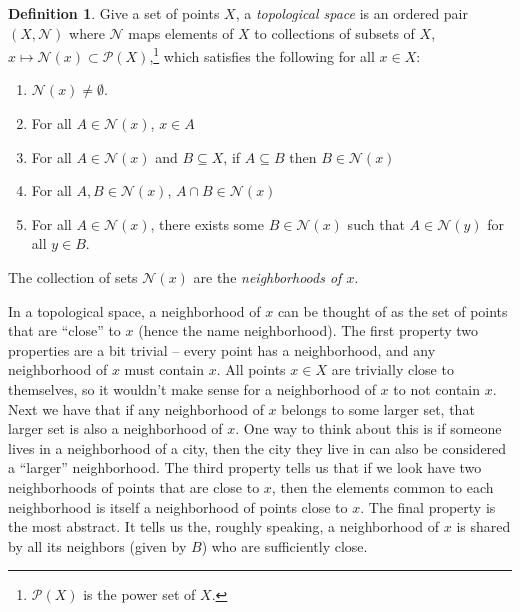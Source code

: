 \documentclass{article}
\theoremstyle{definition}
\newtheorem{definition}{Definition}[section]
\begin{document}
\begin{definition}\label{def13.1}
 Give a set of points $X$, a \textit{\color{red}topological space} is an ordered pair $(X,\mathcal N)$ where $\mathcal N$ maps elements of $X$ to collections of subsets of $X$, $x\mapsto \mathcal N(x)\subset\mathcal P(X)$,\footnote{$\mathcal P(X)$ is the power set of $X$.} which satisfies the following for all $x\in X$:
 \begin{enumerate}
 	\item $\mathcal N(x)\neq \emptyset$.
 	\item For all $A\in \mathcal N(x)$, $x\in A$
 	\item For all $A\in\mathcal N(x)$ and $B\subseteq X$, if $A\subseteq B$ then $B\in \mathcal N(x)$
 	\item For all $A,B\in\mathcal N(x)$, $A\cap B \in\mathcal N(x)$
 	\item For all $A\in \mathcal N(x)$, there exists some $B\in \mathcal N(x)$ such that $A\in\mathcal N(y)$ for all $y\in B$.
 \end{enumerate}
The collection of sets $\mathcal N(x)$ are the \textit{\color{red}neighborhoods of $ x $}. 
\end{definition}

In a topological space, a neighborhood of $x$ can be thought of as the set of points that are ``close'' to $x$ (hence the name neighborhood). The first property two properties are a bit trivial -- every point has a neighborhood, and any neighborhood of $x$ must contain $x$. All points $x\in X$ are trivially close to themselves, so it wouldn't make sense for a neighborhood of $x$ to not contain $x$. Next we have that if any neighborhood of $x$ belongs to some larger set, that larger set is also a neighborhood of $x$. One way to think about this is if someone lives in a neighborhood of a city, then the city they live in can also be considered a ``larger'' neighborhood. The third property tells us that if we look have two neighborhoods of points that are close to $x$, then the elements common to each neighborhood is itself a neighborhood of points close to $x$. The final property is the most abstract. It tells us the, roughly speaking, a neighborhood of $x$ is shared by all its neighbors (given by $B$) who are sufficiently close.  
\end{document}
